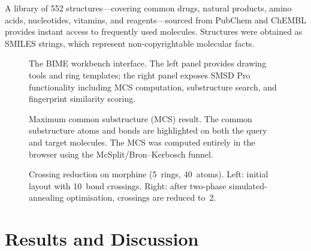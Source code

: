 \documentclass[twocolumn]{article}
\begin{document}
A library of 552 structures---covering common drugs, natural products,
amino acids, nucleotides, vitamins, and reagents---sourced from PubChem
and ChEMBL provides instant access to frequently used molecules.
Structures were obtained as SMILES strings, which represent
non-copyrightable molecular facts.


\begin{figure}[t]
\centering
{}
\caption{The BIME workbench interface.  The left panel provides drawing
  tools and ring templates; the right panel exposes SMSD Pro
  functionality including MCS computation, substructure search, and
  fingerprint similarity scoring.}
\label{fig:workbench}
\end{figure}

\begin{figure}[t]
\centering
{}
\caption{Maximum common substructure (MCS) result.  The common
  substructure atoms and bonds are highlighted on both the query and
  target molecules.  The MCS was computed entirely in the browser
  using the McSplit/Bron--Kerbosch funnel.}
\label{fig:mcs}
\end{figure}

\begin{figure}[t]
\centering
{}
\caption{Crossing reduction on morphine (5~rings, 40~atoms).
  Left: initial layout with 10~bond crossings.
  Right: after two-phase simulated-annealing optimisation,
  crossings are reduced to~2.}
\label{fig:crossings}
\end{figure}

\section{Results and Discussion}
\end{document}
